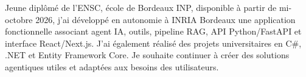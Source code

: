 
\begin{cvparagraph}
Jeune diplômé de l’ENSC, école de Bordeaux INP, disponible à partir de mi-octobre 2026, j’ai développé en autonomie à INRIA Bordeaux une application fonctionnelle associant agent IA, outils, pipeline RAG, API Python/FastAPI et interface React/Next.js. J’ai également réalisé des projets universitaires en C\#, .NET et Entity Framework Core. Je souhaite continuer à créer des solutions agentiques utiles et adaptées aux besoins des utilisateurs.
\end{cvparagraph}
